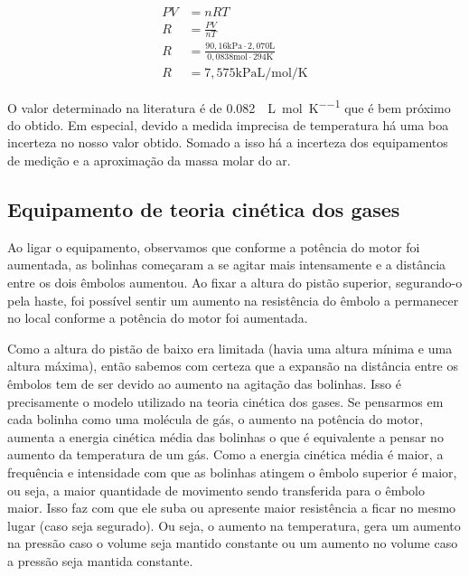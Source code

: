 \begin{align*}
    PV &= nRT\\
    R &= \frac{PV}{nT}\\
    R &= \frac{90,16 \si{\kilo\pascal} \cdot 2,070 \si{\liter}}{0,0838 \si{\mole} \cdot 294 \si{\kelvin}}\\
    R &= 7,575 \si{\kilo\pascal\liter\per\mole\per\kelvin} 
\end{align*}

O valor determinado na literatura é de \qty{0,082}{\atm\liter\per\mole\per\kelvin} que é bem próximo do obtido. Em especial, devido a medida imprecisa de temperatura há uma boa incerteza no nosso valor obtido. Somado a isso há a incerteza dos equipamentos de medição e a aproximação da massa molar do ar.

\subsection{Equipamento de teoria cinética dos gases}

Ao ligar o equipamento, observamos que conforme a potência do motor foi aumentada, as bolinhas começaram a se agitar mais intensamente e a distância entre os dois êmbolos aumentou. Ao fixar a altura do pistão superior, segurando-o pela haste, foi possível sentir um aumento na resistência do êmbolo a permanecer no local conforme a potência do motor foi aumentada. 

Como a altura do pistão de baixo era limitada (havia uma altura mínima e uma altura máxima), então sabemos com certeza que a expansão na distância entre os êmbolos tem de ser devido ao aumento na agitação das bolinhas. Isso é precisamente o modelo utilizado na teoria cinética dos gases. Se pensarmos em cada bolinha como uma molécula de gás, o aumento na potência do motor, aumenta a energia cinética média das bolinhas o que é equivalente a pensar no aumento da temperatura de um gás. Como a energia cinética média é maior, a frequência e intensidade com que as bolinhas atingem o êmbolo superior é maior, ou seja, a maior quantidade de movimento sendo transferida para o êmbolo maior. Isso faz com que ele suba ou apresente maior resistência a ficar no mesmo lugar (caso seja segurado). Ou seja, o aumento na temperatura, gera um aumento na pressão caso o volume seja mantido constante ou um aumento no volume caso a pressão seja mantida constante. 
